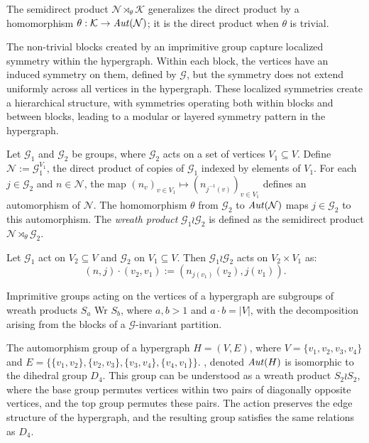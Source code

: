 The semidirect product $\mathcal{N}\rtimes_\theta\mathcal{K}$ generalizes the direct product by a homomorphism $\theta:\mathcal{K}\to\mathit{Aut}(\mathcal{N})$; it is the direct product when $\theta$ is trivial.

The non-trivial blocks created by an imprimitive group capture localized symmetry within the hypergraph. Within each block, the vertices have an induced symmetry on them, defined by $\mathcal{G}$, but the symmetry does not extend uniformly across all vertices in the hypergraph. These localized symmetries create a hierarchical structure, with symmetries operating both within blocks and between blocks, leading to a modular or layered symmetry pattern in the hypergraph. \cite{BCW24}

\begin{definition}
Let $\mathcal{G}_1$ and $\mathcal{G}_2$ be groups, where $\mathcal{G}_2$ acts on a set of vertices $V_1\subseteq V$. Define $\mathcal{N}:=\mathcal{G}_1^{V_1}$, the direct product of copies of $\mathcal{G}_1$ indexed by elements of $V_1$. For each $j\in\mathcal{G}_2$ and $n\in\mathcal{N}$, the map $(n_v)_{v\in V_1}\mapsto(n_{j^{-1}(v)})_{v\in V_1}$ defines an automorphism of $\mathcal{N}$. The homomorphism $\theta$ from $\mathcal{G}_2$ to $\mathit{Aut}(\mathcal{N})$ maps $j\in\mathcal{G}_2$ to this automorphism. The \emph{wreath product} $\mathcal{G}_1\wr\mathcal{G}_2$ is defined as the semidirect product $\mathcal{N}\rtimes_\theta\mathcal{G}_2$.
\end{definition}

Let $\mathcal{G}_1$ act on $V_2\subseteq V$ and $\mathcal{G}_2$ on $V_1\subseteq V$. Then $\mathcal{G}_1\wr\mathcal{G}_2$ acts on $V_2\times V_1$ as:
\[
(n,j)\cdot(v_2,v_1):=(n_{j(v_1)}(v_2),j(v_1)).
\]

Imprimitive groups acting on the vertices of a hypergraph are subgroups of wreath products $S_a$ Wr $S_b$, where $a,b>1$ and $a\cdot b=|V|$, with the decomposition arising from the blocks of a $\mathcal{G}$-invariant partition. \cite{ACS15}

The automorphism group of a hypergraph $H=(V,E)$, where $V=\{v_1,v_2,v_3,v_4\}$ and $E=\{\{v_1,v_2\},\{v_2,v_3\},\{v_3,v_4\},\{v_4,v_1\}\}$. , denoted $\mathit{Aut}(H)$ is isomorphic to the dihedral group $D_4$. This group can be understood as a wreath product $S_2\wr S_2$, where the base group permutes vertices within two pairs of diagonally opposite vertices, and the top group permutes these pairs. The action preserves the edge structure of the hypergraph, and the resulting group satisfies the same relations as $D_4$.

